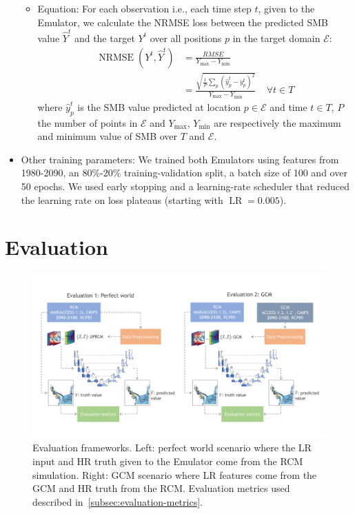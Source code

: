 \documentclass[a4paper,11pt,oneside]{report}
\begin{document}
\begin{itemize}
\begin{itemize}
        \item Equation: For each observation i.e., each time step $t$, given to the Emulator, we calculate the NRMSE loss between the predicted SMB value $\hat{Y}^{t}$ and the target $Y^{t}$ over all positions $p$ in the target domain $\mathcal{E}$:
        \begin{align}
        \operatorname{NRMSE}\left(Y^{t},\hat{Y}^{t}\right) &= \frac{RMSE}{Y_{\max} - Y_{\min}} \\
         &=\frac{\sqrt{\frac{1}{P}\sum_{p}(\hat{y}_{p}^{t}-y^{t}_{p})^2}}{Y_{\max} - Y_{\min}}   \;\;\;\; \forall t \in T
        \end{align}
        where $\hat{y}_{p}^{t}$ is the SMB value predicted at location $p\in \mathcal{E}$ and time $t \in T$, $P$ the number of points in $\mathcal{E}$ and $Y_{\max}$, $Y_{\min}$ are respectively the maximum and minimum value of SMB over $T$ and $\mathcal{E}$.
    \end{itemize}
    \item Other training parameters: We trained both Emulators using features from 1980-2090, an 80\%-20\% training-validation split, a batch size of 100 and over 50 epochs. We used early stopping and a learning-rate scheduler that reduced the learning rate on loss plateaus (starting with $\operatorname{LR} = 0.005$). 
\end{itemize}

\section{Evaluation}\label{sec:evaluation}

\begin{figure}[!t]
  \centering
  \includegraphics[width=\columnwidth]{doc/Thesis-latex/images/results/evaluation_framework.pdf}
  \caption []{\small Evaluation frameworks. Left: perfect world scenario where the LR input and HR truth given to the Emulator come from the RCM simulation. Right: GCM scenario where LR features come from the GCM and HR truth from the RCM. Evaluation metrics used described in~\ref{subsec:evaluation-metrics}.}
  \vspace{-3mm}
  \label{fig:evaluation-framework}
\end{figure}
\end{document}
